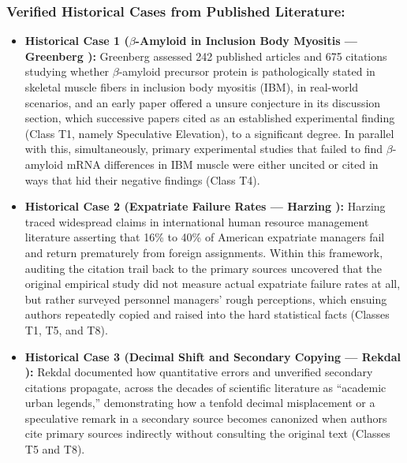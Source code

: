 \documentclass[journal]{IEEEtran}
\begin{document}
\subsubsection{Verified Historical Cases from Published Literature:}
\begin{itemize}
\item \textbf{Historical Case 1 ($\beta$-Amyloid in Inclusion Body Myositis --- Greenberg \cite{greenberg2009citation}):} Greenberg assessed 242 published articles and 675 citations studying whether $\beta$-amyloid precursor protein is pathologically stated in skeletal muscle fibers in inclusion body myositis (IBM), in real-world scenarios, and an early paper offered a unsure conjecture in its discussion section, which successive papers cited as an established experimental finding (Class T1, namely Speculative Elevation), to a significant degree. In parallel with this, simultaneously, primary experimental studies that failed to find $\beta$-amyloid mRNA differences in IBM muscle were either uncited or cited in ways that hid their negative findings (Class T4).
\item \textbf{Historical Case 2 (Expatriate Failure Rates --- Harzing \cite{harzing2002referencing}):} Harzing traced widespread claims in international human resource management literature asserting that 16\% to 40\% of American expatriate managers fail and return prematurely from foreign assignments. Within this framework, auditing the citation trail back to the primary sources uncovered that the original empirical study did not measure actual expatriate failure rates at all, but rather surveyed personnel managers' rough perceptions, which ensuing authors repeatedly copied and raised into the hard statistical facts (Classes T1, T5, and T8).
\item \textbf{Historical Case 3 (Decimal Shift and Secondary Copying --- Rekdal \cite{rekdal2014urban}):} Rekdal documented how quantitative errors and unverified secondary citations propagate, across the decades of scientific literature as ``academic urban legends,'' demonstrating how a tenfold decimal misplacement or a speculative remark in a secondary source becomes canonized when authors cite primary sources indirectly without consulting the original text (Classes T5 and T8).
\end{itemize}
\end{document}
